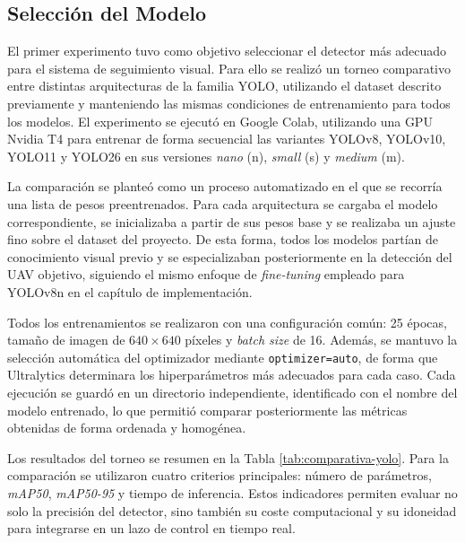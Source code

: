 \vspace{0.3cm}

\subsection{Selección del Modelo}

El primer experimento tuvo como objetivo seleccionar el detector más adecuado para el sistema de seguimiento visual. Para ello se realizó un torneo comparativo entre distintas arquitecturas de la familia YOLO, utilizando el dataset descrito previamente y manteniendo las mismas condiciones de entrenamiento para todos los modelos. El experimento se ejecutó en Google Colab, utilizando una GPU Nvidia T4 para entrenar de forma secuencial las variantes YOLOv8, YOLOv10, YOLO11 y YOLO26 en sus versiones \textit{nano} (n), \textit{small} (s) y \textit{medium} (m).

\vspace{0.3cm}

La comparación se planteó como un proceso automatizado en el que se recorría una lista de pesos preentrenados. Para cada arquitectura se cargaba el modelo correspondiente, se inicializaba a partir de sus pesos base y se realizaba un ajuste fino sobre el dataset del proyecto. De esta forma, todos los modelos partían de conocimiento visual previo y se especializaban posteriormente en la detección del UAV objetivo, siguiendo el mismo enfoque de \textit{fine-tuning} empleado para YOLOv8n en el capítulo de implementación.

\vspace{0.3cm}

Todos los entrenamientos se realizaron con una configuración común: 25 épocas, tamaño de imagen de $640 \times 640$ píxeles y \textit{batch size} de 16. Además, se mantuvo la selección automática del optimizador mediante \texttt{optimizer=auto}, de forma que Ultralytics determinara los hiperparámetros más adecuados para cada caso. Cada ejecución se guardó en un directorio independiente, identificado con el nombre del modelo entrenado, lo que permitió comparar posteriormente las métricas obtenidas de forma ordenada y homogénea.

\vspace{0.3cm}

Los resultados del torneo se resumen en la Tabla \ref{tab:comparativa-yolo}. Para la comparación se utilizaron cuatro criterios principales: número de parámetros, \textit{mAP50}, \textit{mAP50-95} y tiempo de inferencia. Estos indicadores permiten evaluar no solo la precisión del detector, sino también su coste computacional y su idoneidad para integrarse en un lazo de control en tiempo real.

